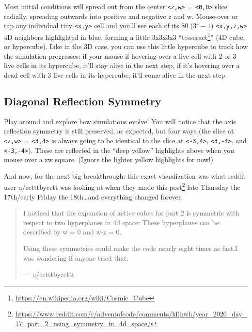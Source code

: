 \documentclass[]{article}
\renewcommand{\href}[2]{#2\footnote{\url{#1}}}
\begin{document}
Most initial conditions will spread out from the center
\texttt{\textless{}z,w\textgreater{}\ =\ \textless{}0,0\textgreater{}} slice
radially, spreading outwards into positive and negative z and w. Mouse-over or
tap any individual tiny \texttt{\textless{}x,y\textgreater{}} cell and you'll
see each of its 80 (\(3^4-1\)) \texttt{\textless{}x,y,z,w\textgreater{}} 4D
neighbors highlighted in blue, forming a little 3x3x3x3
``\href{https://en.wikipedia.org/wiki/Cosmic_Cube}{tesseract}'' (4D cube, or
hypercube). Like in the 3D case, you can use this little hypercube to track how
the simulation progresses: if your mouse if hovering over a live cell with 2 or
3 live cells in its hypercube, it'll stay alive in the next step, if it's
hovering over a dead cell with 3 live cells in its hypercube, it'll come alive
in the next step.

\hypertarget{diagonal-reflection-symmetry}{%
\subsection{Diagonal Reflection Symmetry}\label{diagonal-reflection-symmetry}}

Play around and explore how simulations evolve! You will notice that the axis
reflection symmetry is still preserved, as expected, but four ways (the slice at
\texttt{\textless{}z,w\textgreater{}\ =\ \textless{}3,4\textgreater{}} is always
going to be identical to the slice at \texttt{\textless{}-3,4\textgreater{}},
\texttt{\textless{}3,-4\textgreater{}}, and
\texttt{\textless{}-3,-4\textgreater{}}). These are reflected in the ``deep
yellow'' highlights above when you mouse over a zw square. (Ignore the lighter
yellow highlights for now!)

And now, for the next big breakthrough: this exact visualization was what reddit
user u/cetttbycett was looking at when
\href{https://www.reddit.com/r/adventofcode/comments/kfjhwh/year_2020_day_17_part_2_using_symmetry_in_4d_space/}{they
made this post} late Thursday the 17th/early Friday the 18th\ldots and
everything changed forever.

\begin{quote}
I noticed that the expansion of active cubes for part 2 is symmetric with
respect to two hyperplanes in 4d space: These hyperplanes can be described by w
= 0 and w-z = 0.

Using these symmetries could make the code nearly eight times as fast.I was
wondering if anyone tried that.

--- u/cetttbycettt
\end{quote}
\end{document}
